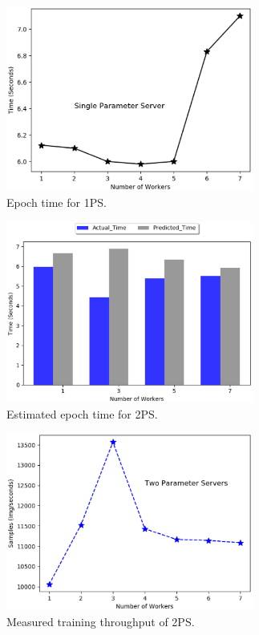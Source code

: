 \documentclass[conference]{IEEEtran}
\begin{document}
\begin{figure}[htb]
  \includegraphics[width=3.2in]{Fig/pslatency}
  \caption{Epoch time for 1PS.}
  \label{fig:pslatency}
\end{figure}

\begin{figure}[htb]
  \includegraphics[width=3.2in]{Fig/2psmodel}
  \caption{Estimated epoch time for 2PS.}
  \label{fig:2psmodel}
\end{figure}

\begin{figure}[htb]
  \includegraphics[width=3.2in]{Fig/2psthroughput}
  \caption{Measured training throughput of 2PS.}
  \label{fig:2psthroughput}
\end{figure}
\end{document}
